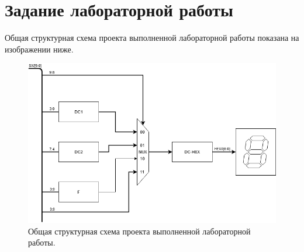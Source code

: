 




\section{Задание лабораторной работы}

Общая структурная схема проекта выполненной лабораторной работы показана на изображении ниже.

\begin{figure}[H]
  \centering
  \includegraphics [width=1\textwidth] {images/lab_1/lab1_sch.png}
  \caption{Общая структурная схема проекта выполненной лабораторной работы.}
\end{figure}


